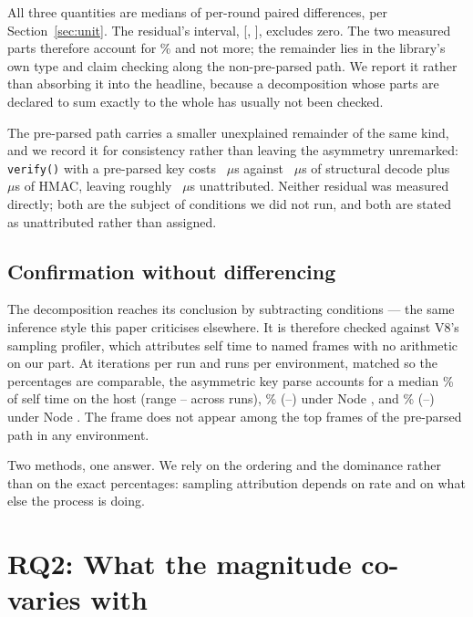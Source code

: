 \documentclass[pdflatex,sn-basic,twocolumn]{sn-jnl}%
\begin{document}
All three quantities are medians of per-round paired differences, per
Section~\ref{sec:unit}. The residual's interval,
[\DecompResidualCiLo, \DecompResidualCiHi], excludes zero. The two measured
parts therefore account for \DecompExplainedPct\% and not more; the remainder
lies in the library's own type and claim checking along the non-pre-parsed path.
We report it rather than absorbing it into the headline, because a decomposition
whose parts are declared to sum exactly to the whole has usually not been
checked.

The pre-parsed path carries a smaller unexplained remainder of the same kind, and
we record it for consistency rather than leaving the asymmetry unremarked:
\texttt{verify()} with a pre-parsed key costs \HostJwtPreparsed~$\mu$s against
\HostDecodeOnly~$\mu$s of structural decode plus \HostHmacKeyObject~$\mu$s of
HMAC, leaving roughly \PreparsedUnattributed~$\mu$s unattributed. Neither
residual was measured directly; both are the subject of conditions we did not
run, and both are stated as unattributed rather than assigned.

\subsection{Confirmation without differencing}

The decomposition reaches its conclusion by subtracting conditions --- the same
inference style this paper criticises elsewhere. It is therefore checked against
V8's sampling profiler, which attributes self time to named frames with no
arithmetic on our part. At \ProfIterations{} iterations per run and
\ProfRepeats{} runs per environment, matched so the percentages are comparable,
the asymmetric key parse accounts for a median \ProfHostPct\% of self time on
the host (range \ProfHostPctLo--\ProfHostPctHi{} across runs),
\ProfEighteenPct\% (\ProfEighteenPctLo--\ProfEighteenPctHi) under Node
\NodeEighteenNodeMajor, and \ProfTwentySixPct\%
(\ProfTwentySixPctLo--\ProfTwentySixPctHi) under Node
\NodeTwentySixMuslNodeMajor. The frame does not appear among the top frames of
the pre-parsed path in any environment.

Two methods, one answer. We rely on the ordering and the dominance rather than on
the exact percentages: sampling attribution depends on rate and on what else the
process is doing.

\section{RQ2: What the magnitude co-varies with}\label{sec:rq2}
\end{document}

